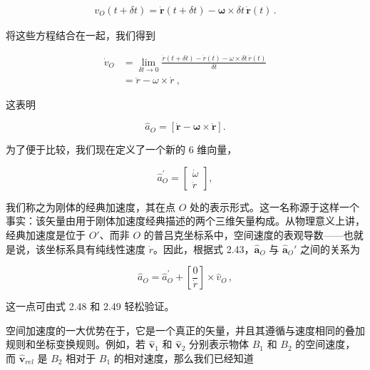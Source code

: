 \documentclass[10pt,a4paper]{book}
\theoremstyle{thmstyle} %
\theoremstyle{defstyle} %
\theoremstyle{prostyle} %
\begin{document}
$$
\begin{array}{r} { v _ { O } ( t + \delta t ) = \dot { \boldsymbol { r } } ( t + \delta t ) - \boldsymbol { \omega } \times \delta t \, \dot { \boldsymbol { r } } ( t ) \, . } \end{array}
$$



将这些方程结合在一起，我们得到



$$
\begin{array}{rl} { \dot { v } _ { O } } & { = \operatorname* { l i m } _ { \delta t \to 0 } \frac { \dot { r } ( t + \delta t ) - \dot { r } ( t ) - \omega \times \delta t \, \dot { r } ( t ) } { \delta t } } \\& { = \ddot { r } - \omega \times \dot { r } \ , } \end{array}
$$



这表明



$$
{ \hat { a } } _ { O } = \left[ { \dot { \boldsymbol { r } } } - { \boldsymbol { \omega } } \times { \dot { \boldsymbol { r } } } \right] .
$$



为了便于比较，我们现在定义了一个新的 6 维向量，



$$
\hat { a } _ { O } ^{\prime} = \left[ \begin{array}{l} { \dot { \omega } } \\{ \ddot { r } } \end{array} \right] ,
$$



我们称之为刚体的经典加速度，其在点 $O$ 处的表示形式。这一名称源于这样一个事实：该矢量由用于刚体加速度经典描述的两个三维矢量构成。从物理意义上讲，经典加速度是位于 $O'$、而非 $O$ 的普吕克坐标系中，空间速度的表观导数——也就是说，该坐标系具有纯线性速度 $\dot{r}$。因此，根据式 2.43，$\hat{\mathbf{a}}_O$ 与 $\hat{\mathbf{a}}_O'$ 之间的关系为



$$
\hat { a } _ { O } = \hat { a } _ { O } ^{\prime} + \left[ \frac { 0 } { \dot { r } } \right] \times \hat { v } _ { O } \, ,
$$



这一点可由式 2.48 和 2.49 轻松验证。



空间加速度的一大优势在于，它是一个真正的矢量，并且其遵循与速度相同的叠加规则和坐标变换规则。例如，若 $\hat{\mathbf{v}}_{1}$ 和 $\hat{\mathbf{v}}_{2}$ 分别表示物体 $B_{1}$ 和 $B_{2}$ 的空间速度，而 $\hat{\mathbf{v}}_{rel}$ 是 $B_{2}$ 相对于 $B_{1}$ 的相对速度，那么我们已经知道
\end{document}
